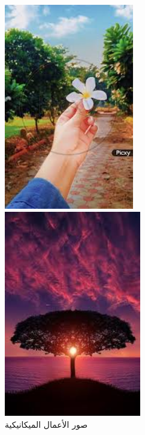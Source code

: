 \documentclass{article}
\begin{document}
\begin{figure}[H]
    \begin{minipage}{0.45\textwidth}
        \centering
        \includegraphics[height=9cm,width=\textwidth]{mech/3.jpg}
    \end{minipage}
    \hfill
    \begin{minipage}{0.45\textwidth}
        \centering
        \includegraphics[height=9cm,width=\textwidth]{mech/4.jpg}
    \end{minipage}
        \caption{صور الأعمال الميكانيكية}
\end{figure}
\end{document}
